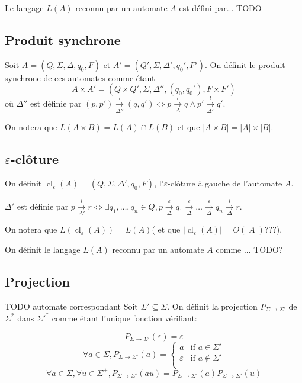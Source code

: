 \documentclass[10pt,a4paper]{article}
\begin{document}
Le langage $L(A)$ reconnu par un automate $A$ est d\'efini par... TODO


\subsection{Produit synchrone}

Soit $A = (Q, \Sigma, \Delta, q_0, F)$ et $A' = (Q', \Sigma, \Delta', q_0', F')$. On définit le produit synchrone de ces automates comme \'etant $$A\times A' = (Q \times Q', \Sigma, \Delta'', (q_0, q_0'), F\times F')$$ o\`u $\Delta''$ est d\'efinie par $(p,p')\overset{l}{\underset{\Delta''}{\to}}(q,q') \iff p\overset{l}{\underset{\Delta}{\to}}q \land p'\overset{l}{\underset{\Delta'}{\to}}q'$.

On notera que $L(A\times B) = L(A) \cap L(B)$ et que $|A\times B| = |A| \times |B|$.

\subsection{$\varepsilon$-clôture}

On définit  $\operatorname{cl}_\varepsilon(A) = (Q, \Sigma, \Delta', q_0, F)$, l'$\varepsilon$-clôture \`a gauche de l'automate $A$.

$\Delta'$ est d\'efinie par $p \overset{l}{\underset{\Delta'}{\to}} r \iff \exists q_1,\dots,q_n \in Q, p \overset{\varepsilon}{\underset{\Delta}{\to}} q_1 \overset{\varepsilon}{\underset{\Delta}{\to}} \dots \overset{\varepsilon}{\underset{\Delta}{\to}} q_n \overset{l}{\underset{\Delta}{\to}} r$.

On notera que $L(\operatorname{cl}_\varepsilon(A))=L(A)$( et que $|\operatorname{cl}_\varepsilon(A)|=O(|A|)$???).

On d\'efinit le langage $L(A)$ reconnu par un automate $A$ comme ... TODO?

\subsection{Projection}
TODO automate correspondant
Soit $\Sigma'\subseteq \Sigma$. On d\'efinit la projection $P_{\Sigma \to \Sigma'}$ de $\Sigma^*$ dans $\Sigma'^*$ comme \'etant l'unique fonction v\'erifiant:

$$P_{\Sigma \to \Sigma'}(\varepsilon) = \varepsilon$$
$$\forall a \in \Sigma, P_{\Sigma \to \Sigma'}(a)=\left\{\begin{array}{ll}
a &\text{if } a\in \Sigma'\\
\varepsilon &\text{if } a\not\in \Sigma'\\
\end{array}\right.$$
$$\forall a \in \Sigma, \forall u \in \Sigma^+, P_{\Sigma \to \Sigma'}(au)=P_{\Sigma \to \Sigma'}(a)P_{\Sigma \to \Sigma'}(u)$$
\end{document}
